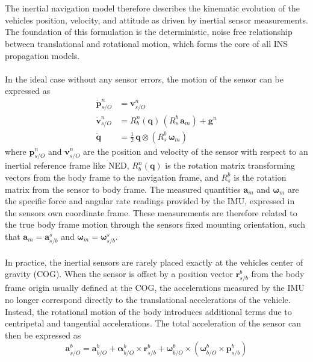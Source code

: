 \\ \\
The inertial navigation model therefore describes the kinematic evolution of the vehicles position, velocity, and attitude as driven by inertial sensor measurements. The foundation of this formulation is the deterministic, noise free relationship between translational and rotational motion, which forms the core of all INS propagation models.  
\\ \\
In the ideal case without any sensor errors, the motion of the sensor can be expressed as
$$
\begin{aligned}
    \dot{\mathbf{p}}_{s/O}^{n} &= \mathbf{v}_{s/O}^{n} \\
    \dot{\mathbf{v}}_{s/O}^{n} &= R_b^n(\mathbf{q})\,(R_s^b\,\mathbf{a}_m) + \mathbf{g}^n \\
    \dot{\mathbf{q}} &= \tfrac{1}{2}\,\mathbf{q} \otimes (R_s^b\,\boldsymbol{\omega}_m)
\end{aligned}
$$
where $\mathbf{p}_{s/O}^{n}$ and $\mathbf{v}_{s/O}^{n}$ are the position and velocity of the sensor with respect to an inertial reference frame like NED, $R_b^n(\mathbf{q})$ is the rotation matrix transforming vectors from the body frame to the navigation frame, and $R_s^b$ is the rotation matrix from the sensor to body frame. The measured quantities $\mathbf{a}_m$ and $\boldsymbol{\omega}_m$ are the specific force and angular rate readings provided by the IMU, expressed in the sensors own coordinate frame. These measurements are therefore related to the true body frame motion through the sensors fixed mounting orientation, such that $\mathbf{a}_m = \mathbf{a}_{s/b}^{s}$ and $\boldsymbol{\omega}_m = \boldsymbol{\omega}_{s/b}^{s}$.  
\\ \\
In practice, the inertial sensors are rarely placed exactly at the vehicles center of gravity (COG). When the sensor is offset by a position vector $\mathbf{r}_{s/b}^{b}$ from the body frame origin usually defined at the COG, the accelerations measured by the IMU no longer correspond directly to the translational accelerations of the vehicle. Instead, the rotational motion of the body introduces additional terms due to centripetal and tangential accelerations. The total acceleration of the sensor can then be expressed as
$$
    \mathbf{a}_{s/O}^{b} = \mathbf{a}_{b/O}^{b} + \boldsymbol{\alpha}_{b/O}^{b} \times \mathbf{r}_{s/b}^{b} + \boldsymbol{\omega}_{b/O}^{b} \times (\boldsymbol{\omega}_{b/O}^{b} \times \mathbf{p}_{s/b}^{b})
$$
